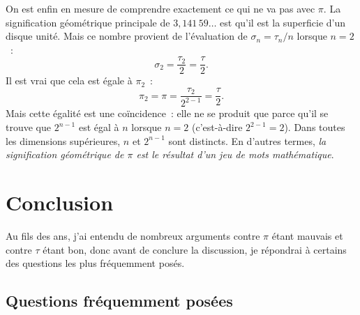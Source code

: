 On est enfin en mesure de comprendre exactement ce qui ne va pas avec $\pi$. La signification géométrique principale de $3{,}141\,59\ldots$ est qu'il est la superficie d'un disque unité. Mais ce nombre provient de l'évaluation de $\sigma_n = \tau_n/n$ lorsque $n=2$~:
\[
\sigma_2 = \frac{\tau_2}{2} = \frac{\tau}{2}.
\]
Il est vrai que cela est égale à $\pi_2$~:
\[
\pi_2 = \pi = \frac{\tau_2}{2^{2-1}} = \frac{\tau}{2}.
\]
Mais cette égalité est une coïncidence~: elle ne se produit que parce qu'il se trouve que $2^{n-1}$ est égal à $n$ lorsque $n=2$ (c'est-à-dire $2^{2-1} = 2$). Dans toutes les dimensions supérieures, $n$ et $2^{n-1}$ sont distincts. En d'autres termes, \emph{la signification géométrique de $\pi$ est le résultat d'un jeu de mots mathématique}.


\section{Conclusion}
\label{sec:conclusion}

Au fils des ans, j'ai entendu de nombreux arguments contre $\pi$ étant mauvais et contre $\tau$ étant bon, donc avant de conclure la discussion, je répondrai à certains des questions les plus fréquemment posés.

  \subsection{Questions fréquemment posées} %
  \label{sec:faq}

